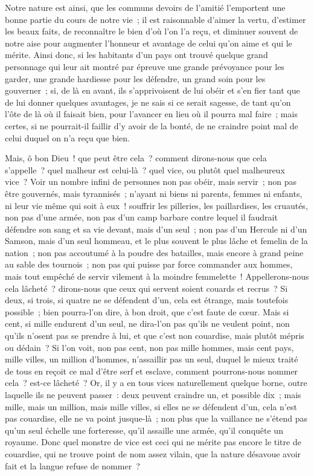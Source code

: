 \documentclass[french,twoside]{book} %
\begin{document}
Notre nature est ainsi, que les communs devoirs de l’amitié l’emportent une bonne partie du cours de notre vie ; il est raisonnable d’aimer la vertu, d’estimer les beaux faits, de reconnaître le bien d’où l’on l’a reçu, et diminuer souvent de notre aise pour augmenter l’honneur et avantage de celui qu’on aime et qui le mérite. Ainsi donc, si les habitants d’un pays ont trouvé quelque grand personnage qui leur ait montré par épreuve une grande prévoyance pour les garder, une grande hardiesse pour les défendre, un grand soin pour les gouverner ; si, de là en avant, ils s’apprivoisent de lui obéir et s’en fier tant que de lui donner quelques avantages, je ne sais si ce serait sagesse, de tant qu’on l’ôte de là où il faisait bien, pour l’avancer en lieu où il pourra mal faire ; mais certes, si ne pourrait-il faillir d’y avoir de la bonté, de ne craindre point mal de celui duquel on n’a reçu que bien.\par
Mais, ô bon Dieu ! que peut être cela ? comment dirons-nous que cela s’appelle ? quel malheur est celui-là ? quel vice, ou plutôt quel malheureux vice ? Voir un nombre infini de personnes non pas obéir, mais servir ; non pas être gouvernés, mais tyrannisés ; n’ayant ni biens ni parents, femmes ni enfants, ni leur vie même qui soit à eux ! souffrir les pilleries, les paillardises, les cruautés, non pas d’une armée, non pas d’un camp barbare contre lequel il faudrait défendre son sang et sa vie devant, mais d’un seul ; non pas d’un Hercule ni d’un Samson, mais d’un seul hommeau, et le plus souvent le plus lâche et femelin de la nation ; non pas accoutumé à la poudre des batailles, mais encore à grand peine au sable des tournois ; non pas qui puisse par force commander aux hommes, mais tout empêché de servir vilement à la moindre femmelette ! Appellerons-nous cela lâcheté ? dirons-nous que ceux qui servent soient couards et recrus ? Si deux, si trois, si quatre ne se défendent d’un, cela est étrange, mais toutefois possible ; bien pourra-l’on dire, à bon droit, que c’est faute de cœur. Mais si cent, si mille endurent d’un seul, ne dira-l’on pas qu’ils ne veulent point, non qu’ils n’osent pas se prendre à lui, et que c’est non couardise, mais plutôt mépris ou dédain ? Si l’on voit, non pas cent, non pas mille hommes, mais cent pays, mille villes, un million d’hommes, n’assaillir pas un seul, duquel le mieux traité de tous en reçoit ce mal d’être serf et esclave, comment pourrons-nous nommer cela ? est-ce lâcheté ? Or, il y a en tous vices naturellement quelque borne, outre laquelle ils ne peuvent passer : deux peuvent craindre un, et possible dix ; mais mille, mais un million, mais mille villes, si elles ne se défendent d’un, cela n’est pas couardise, elle ne va point jusque-là ; non plus que la vaillance ne s’étend pas qu’un seul échelle une forteresse, qu’il assaille une armée, qu’il conquête un royaume. Donc quel monstre de vice est ceci qui ne mérite pas encore le titre de couardise, qui ne trouve point de nom assez vilain, que la nature désavoue avoir fait et la langue refuse de nommer ?\par
\end{document}
